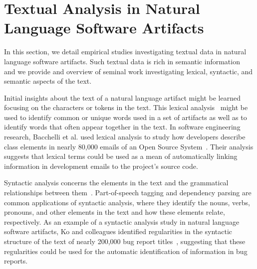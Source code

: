 



\section{Textual Analysis in Natural Language Software Artifacts}
\label{cp2:text-in-se}



In this section, we detail empirical studies investigating 
textual data in natural language software artifacts. 
Such textual data is  rich in semantic information~\cite{dekhtyar2004} 
and we provide and overview of seminal work 
investigating lexical, syntactic, and semantic aspects of the text.




Initial insights about the text of a natural language artifact might be learned focusing on 
the characters or tokens in the text.
This lexical analysis~\cite{jurafsky2014speech} might be used to identify common or unique words 
used in a set of artifacts as well as to identify words that often appear together in the text.
In software engineering research, Bacchelli et al. used lexical analysis to study how developers describe class elements
in nearly 80,000 emails of an Open Source System~\cite{bacchelli2009}.
Their analysis suggests that lexical terms could be 
used as a mean of automatically linking information in development emails to 
the project's source code.







Syntactic analysis concerns the  elements in the text 
and the grammatical relationships between them~\cite{jurafsky2014speech}. 
Part-of-speech tagging and dependency parsing are common applications of syntactic analysis,
where they identify the nouns, verbs, pronouns, and other elements in the text 
and how these elements relate, respectively. 
As an example of a syntactic analysis study in natural language software artifacts, 
Ko and colleagues identified regularities in the syntactic structure of the text 
of nearly 200,000 bug report titles~\cite{Ko2006}, suggesting that these 
regularities could be used for the automatic identification 
of information in bug reports. 






